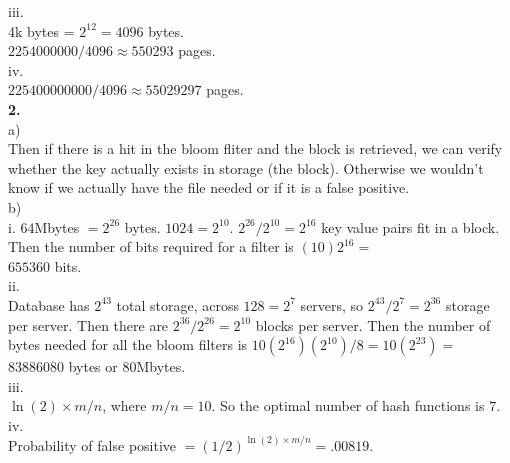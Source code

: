 \documentclass[12pt, letterpaper, fleqn]{article}
\begin{document}
  iii. \\
  4k bytes = $2^{12} = 4096$ bytes.\\
  $2254000000 / 4096 \approx 550293$ pages.\\

  iv. \\
  $225400000000 / 4096 \approx 55029297$ pages.\\
  
  \textbf{2.}\\
  a) \\
  Then if there is a hit in the bloom fliter and the block is retrieved, we can
  verify whether the key actually exists in storage (the block). Otherwise we
  wouldn't know if we actually have the file needed or if it is a false
  positive.\\

  b) \\
  i. $64$Mbytes $= 2^{26}$ bytes. $1024 = 2^{10}$. $2^{26} / 2^{10} = 2^{16}$
  key value pairs fit in a block. Then the number of bits required for a filter
  is $(10) 2^{16} = $ \\
  $655360$ bits. \\

  ii. \\
  Database has $2^{43}$ total storage, across $128 = 2^7$ servers, so $2^{43} /
  2^{7} = 2^{36}$ storage per server. Then there are $2^{36} / 2^{26} = 2^{10}$
  blocks per server. Then the number of bytes needed for all the bloom filters is
  $10 (2^{16}) (2^{10}) / 8 = 10 (2^{23})= $\\
  $83886080$ bytes or $80 $Mbytes.\\

  iii. \\
  $\ln(2) \times m/n$, where $m/n = 10$. So the optimal number of hash functions is
  $7$. \\

  iv. \\
  Probability of false positive $= (1/2)^{\ln(2) \times m/n} = .00819$.
  
\end{document}
